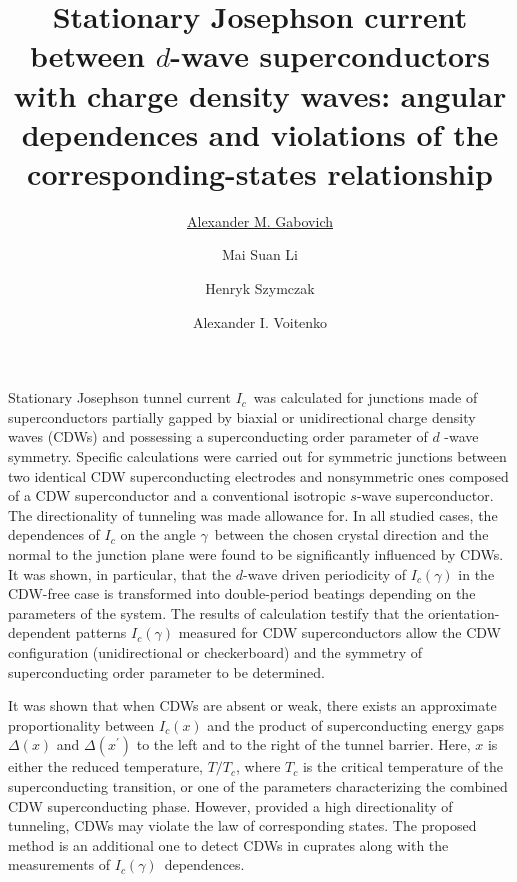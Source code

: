 \documentclass[prl,aps,superscriptaddress]{revtex4}
\begin{document}
\title{Stationary Josephson current between $d$-wave superconductors with
charge density waves: angular dependences and violations of the
corresponding-states relationship}
\author{\underline{Alexander M. Gabovich}}
\author{Mai Suan Li}
\author{Henryk Szymczak}
\author{Alexander I. Voitenko}
\maketitle

Stationary Josephson tunnel current $I_{c}$\ was calculated for junctions
made of superconductors partially gapped by biaxial or unidirectional charge
density waves (CDWs) and possessing a superconducting order parameter of $d$%
-wave symmetry. Specific calculations were carried out for symmetric
junctions between two identical CDW superconducting electrodes and
nonsymmetric ones composed of a CDW superconductor and a conventional
isotropic $s$-wave superconductor. The directionality of tunneling was made
allowance for. In all studied cases, the dependences of $I_{c}$ on the angle 
$\gamma $\ between the chosen crystal direction and the normal to the
junction plane were found to be significantly influenced by CDWs. It was
shown, in particular, that the $d$-wave driven periodicity of $I_{c}(\gamma
) $ in the CDW-free case is transformed into double-period beatings
depending on the parameters of the system. The results of calculation
testify that the orientation-dependent patterns $I_{c}(\gamma )$ measured
for CDW superconductors allow the CDW configuration (unidirectional or
checkerboard) and the symmetry of superconducting order parameter to be
determined.

It was shown that when CDWs are absent or weak, there exists an approximate
proportionality between $I_{c}(x)$ and the product of superconducting energy
gaps $\Delta (x)$ and $\Delta (x^{\prime })$ to the left and to the right of
the tunnel barrier. Here, $x$ is either the reduced temperature, $T/T_{c}$,
where $T_{c}$ is the critical temperature of the superconducting transition,
or one of the parameters characterizing the combined CDW superconducting
phase. However, provided a high directionality of tunneling, CDWs may
violate the law of corresponding states\textrm{.} The proposed method is an
additional one to detect CDWs in cuprates along with the measurements of $%
I_{c}(\gamma )$\ dependences.
\end{document}
